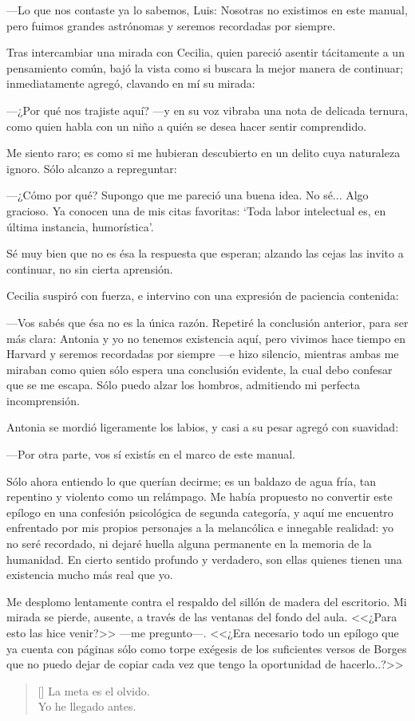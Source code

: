 ---Lo que nos contaste ya lo sabemos, Luis: Nosotras no existimos en
este manual, pero fuimos grandes astrónomas y seremos recordadas por
siempre.

Tras intercambiar una mirada con Cecilia, quien pareció asentir
tácitamente a un pensamiento común, bajó la vista como si buscara la
mejor manera de continuar; inmediatamente agregó, clavando en mí su
mirada:

---¿Por qué nos trajiste aquí? ---y en su voz vibraba una nota de
delicada ternura, como quien habla con un niño a quién se desea hacer
sentir comprendido.

Me siento raro; es como si me hubieran descubierto en un delito cuya
naturaleza ignoro. Sólo alcanzo a repreguntar:

---¿Cómo por qué?  Supongo que me pareció una buena idea. No
sé... Algo gracioso. Ya conocen una de mis citas favoritas: `Toda
labor intelectual es, en última instancia, humorística'.

Sé muy bien que no es ésa la respuesta que esperan; alzando las cejas
las invito a continuar, no sin cierta aprensión.

Cecilia suspiró con fuerza, e intervino con una expresión de paciencia
contenida:

---Vos sabés que ésa no es la única razón. Repetiré la conclusión
anterior, para ser más clara: Antonia y yo no tenemos existencia aquí,
pero vivimos hace tiempo en Harvard y seremos recordadas por siempre
---e hizo silencio, mientras ambas me miraban como quien sólo espera
una conclusión evidente, la cual debo confesar que se me escapa. Sólo
puedo alzar los hombros, admitiendo mi perfecta incomprensión.

Antonia se mordió ligeramente los labios, y casi a su pesar agregó con
suavidad:

---Por otra parte, vos sí existís en el marco de este manual.

Sólo ahora entiendo lo que querían decirme; es un baldazo de agua
fría, tan repentino y violento como un relámpago. Me había propuesto
no convertir este epílogo en una confesión psicológica de segunda
categoría, y aquí me encuentro enfrentado por mis propios personajes a
la melancólica e innegable realidad: yo no seré recordado, ni dejaré
huella alguna permanente en la memoria de la humanidad. En cierto
sentido profundo y verdadero, son ellas quienes tienen una existencia
mucho más real que yo.

\label{pag:epilogo-2}
Me desplomo lentamente contra el respaldo del sillón de madera del
escritorio. Mi mirada se pierde, ausente, a través de las ventanas del
fondo del aula. <<¿Para esto las hice venir?>> ---me pregunto---.
<<¿Era necesario todo un epílogo que ya cuenta con
 páginas sólo como
torpe exégesis de los suficientes versos de Borges que no puedo dejar
de copiar cada vez que tengo la oportunidad de hacerlo..?>>
\settowidth{\versewidth}{La meta es el olvido.}
\PlainPoemTitle
{}
\begin{verse}[\versewidth]
La meta es el olvido.\\
Yo he llegado antes.
\end{verse}

